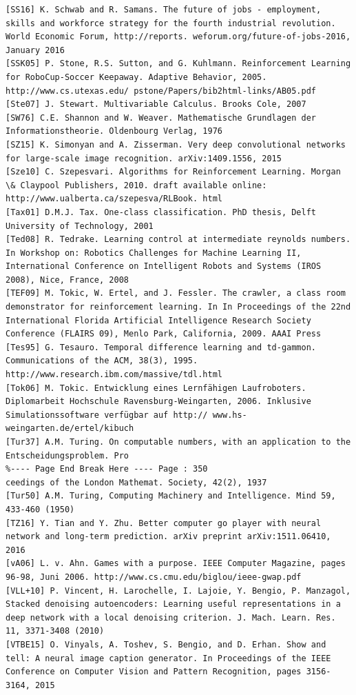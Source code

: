 \documentclass[10pt]{article}
\begin{document}
\begin{verbatim}
[SS16] K. Schwab and R. Samans. The future of jobs - employment, skills and workforce strategy for the fourth industrial revolution. World Economic Forum, http://reports. weforum.org/future-of-jobs-2016, January 2016
[SSK05] P. Stone, R.S. Sutton, and G. Kuhlmann. Reinforcement Learning for RoboCup-Soccer Keepaway. Adaptive Behavior, 2005. http://www.cs.utexas.edu/ pstone/Papers/bib2html-links/AB05.pdf
[Ste07] J. Stewart. Multivariable Calculus. Brooks Cole, 2007
[SW76] C.E. Shannon and W. Weaver. Mathematische Grundlagen der Informationstheorie. Oldenbourg Verlag, 1976
[SZ15] K. Simonyan and A. Zisserman. Very deep convolutional networks for large-scale image recognition. arXiv:1409.1556, 2015
[Sze10] C. Szepesvari. Algorithms for Reinforcement Learning. Morgan \& Claypool Publishers, 2010. draft available online: http://www.ualberta.ca/szepesva/RLBook. html
[Tax01] D.M.J. Tax. One-class classification. PhD thesis, Delft University of Technology, 2001
[Ted08] R. Tedrake. Learning control at intermediate reynolds numbers. In Workshop on: Robotics Challenges for Machine Learning II, International Conference on Intelligent Robots and Systems (IROS 2008), Nice, France, 2008
[TEF09] M. Tokic, W. Ertel, and J. Fessler. The crawler, a class room demonstrator for reinforcement learning. In In Proceedings of the 22nd International Florida Artificial Intelligence Research Society Conference (FLAIRS 09), Menlo Park, California, 2009. AAAI Press
[Tes95] G. Tesauro. Temporal difference learning and td-gammon. Communications of the ACM, 38(3), 1995. http://www.research.ibm.com/massive/tdl.html
[Tok06] M. Tokic. Entwicklung eines Lernfähigen Laufroboters. Diplomarbeit Hochschule Ravensburg-Weingarten, 2006. Inklusive Simulationssoftware verfügbar auf http:// www.hs-weingarten.de/ertel/kibuch
[Tur37] A.M. Turing. On computable numbers, with an application to the Entscheidungsproblem. Pro
%---- Page End Break Here ---- Page : 350
ceedings of the London Mathemat. Society, 42(2), 1937
[Tur50] A.M. Turing, Computing Machinery and Intelligence. Mind 59, 433-460 (1950)
[TZ16] Y. Tian and Y. Zhu. Better computer go player with neural network and long-term prediction. arXiv preprint arXiv:1511.06410, 2016
[vA06] L. v. Ahn. Games with a purpose. IEEE Computer Magazine, pages 96-98, Juni 2006. http://www.cs.cmu.edu/biglou/ieee-gwap.pdf
[VLL+10] P. Vincent, H. Larochelle, I. Lajoie, Y. Bengio, P. Manzagol, Stacked denoising autoencoders: Learning useful representations in a deep network with a local denoising criterion. J. Mach. Learn. Res. 11, 3371-3408 (2010)
[VTBE15] O. Vinyals, A. Toshev, S. Bengio, and D. Erhan. Show and tell: A neural image caption generator. In Proceedings of the IEEE Conference on Computer Vision and Pattern Recognition, pages 3156-3164, 2015

\end{verbatim}
\end{document}
